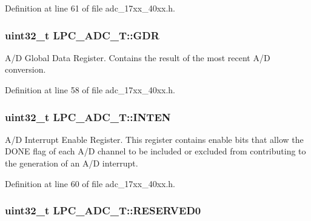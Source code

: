 Definition at line 61 of file adc\+\_\+17xx\+\_\+40xx.\+h.

\subsubsection[{\texorpdfstring{G\+DR}{GDR}}]{ uint32\+\_\+t L\+P\+C\+\_\+\+A\+D\+C\+\_\+\+T\+::\+G\+DR}\hypertarget{structLPC__ADC__T_a063e42ec8fcdcf5590579a8d1a888ca0}{}\label{structLPC__ADC__T_a063e42ec8fcdcf5590579a8d1a888ca0}
A/D Global Data Register. Contains the result of the most recent A/D conversion. 

Definition at line 58 of file adc\+\_\+17xx\+\_\+40xx.\+h.

\subsubsection[{\texorpdfstring{I\+N\+T\+EN}{INTEN}}]{ uint32\+\_\+t L\+P\+C\+\_\+\+A\+D\+C\+\_\+\+T\+::\+I\+N\+T\+EN}\hypertarget{structLPC__ADC__T_a3ed883c378f817342d10cb7ed29a05ae}{}\label{structLPC__ADC__T_a3ed883c378f817342d10cb7ed29a05ae}
A/D Interrupt Enable Register. This register contains enable bits that allow the D\+O\+NE flag of each A/D channel to be included or excluded from contributing to the generation of an A/D interrupt. 

Definition at line 60 of file adc\+\_\+17xx\+\_\+40xx.\+h.

\subsubsection[{\texorpdfstring{R\+E\+S\+E\+R\+V\+E\+D0}{RESERVED0}}]{ uint32\+\_\+t L\+P\+C\+\_\+\+A\+D\+C\+\_\+\+T\+::\+R\+E\+S\+E\+R\+V\+E\+D0}\hypertarget{structLPC__ADC__T_afeba3e59f72b009dfb03377557ddcd60}{}\label{structLPC__ADC__T_afeba3e59f72b009dfb03377557ddcd60}


